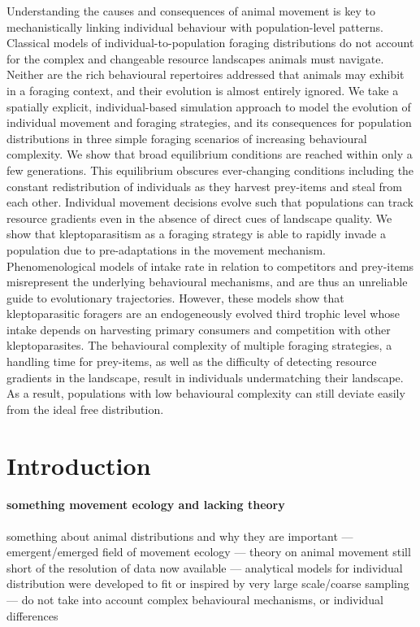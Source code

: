 \documentclass[11pt]{article}
\begin{document}
Understanding the causes and consequences of animal movement is key to mechanistically linking individual behaviour with population-level patterns.
Classical models of individual-to-population foraging distributions do not account for the complex and changeable resource landscapes animals must navigate.
Neither are the rich behavioural repertoires addressed that animals may exhibit in a foraging context, and their evolution is almost entirely ignored.
We take a spatially explicit, individual-based simulation approach to model the evolution of individual movement and foraging strategies, and its consequences for population distributions in three simple foraging scenarios of increasing behavioural complexity.
We show that broad equilibrium conditions are reached within only a few generations.
This equilibrium obscures ever-changing conditions including the constant redistribution of individuals as they harvest prey-items and steal from each other.
Individual movement decisions evolve such that populations can track resource gradients even in the absence of direct cues of landscape quality.
We show that kleptoparasitism as a foraging strategy is able to rapidly invade a population due to pre-adaptations in the movement mechanism.
Phenomenological models of intake rate in relation to competitors and prey-items misrepresent the underlying behavioural mechanisms, and are thus an unreliable guide to evolutionary trajectories.
However, these models show that kleptoparasitic foragers are an endogeneously evolved third trophic level whose intake depends on harvesting primary consumers and competition with other kleptoparasites.
The behavioural complexity of multiple foraging strategies, a handling time for prey-items, as well as the difficulty of detecting resource gradients in the landscape, result in individuals undermatching their landscape.
As a result, populations with low behavioural complexity can still deviate easily from the ideal free distribution.

\newpage{}

\section{Introduction}

\paragraph{something movement ecology and lacking theory}

something about animal distributions and why they are important --- emergent/emerged field of movement ecology --- theory on animal movement still short of the resolution of data now available --- analytical models for individual distribution were developed to fit or inspired by very large scale/coarse sampling --- do not take into account complex behavioural mechanisms, or individual differences
\end{document}
